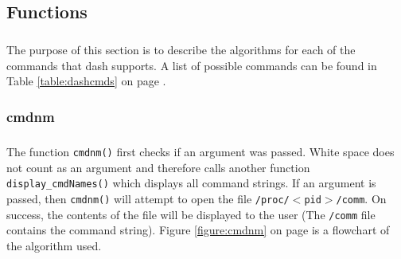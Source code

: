 \documentclass[10pt]{article}
\begin{document}
\subsection{Functions}
\subparagraph{}
The purpose of this section is to describe the algorithms for each of the commands that dash supports. A list of possible commands can be found in Table \ref{table:dashcmds} on page \pageref{table:dashcmds}. 


\subsubsection{cmdnm}
\subparagraph{}
The function \texttt{cmdnm()} first checks if an argument was passed. White space does not count as an argument and therefore calls another function \texttt{display\_cmdNames()} which displays all command strings. If an argument is passed, then \texttt{cmdnm()} will attempt to open the file \texttt{/proc/$<$pid$>$/comm}. On success, the contents of the file will be displayed to the user (The \texttt{/comm} file contains the command string). Figure \ref{figure:cmdnm} on page \pageref{figure:cmdnm} is a flowchart of the algorithm used.
\end{document}
